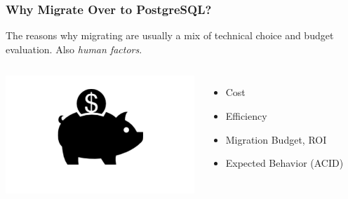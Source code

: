 \documentclass{beamer}
\begin{document}
\begin{frame}[fragile]
  \frametitle{Why Migrate Over to PostgreSQL?}

  The reasons why migrating are usually a mix of technical choice and budget
  evaluation. Also \textit{human factors}.
  \vfill
  
  \begin{columns}[c]
    \begin{center}
      \includegraphics[height=12em]{cost_effective_black.png}
    \end{center}

    \begin{itemize}
    \item Cost
    \item Efficiency
    \item Migration Budget, ROI
    \item Expected Behavior (ACID)
    \end{itemize}
  \end{columns}
\end{frame}
\end{document}
